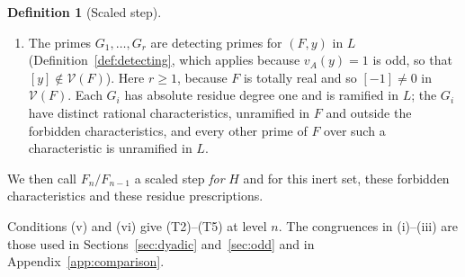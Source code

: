 \documentclass[11pt]{article}
\theoremstyle{plain}
\theoremstyle{definition}
\newtheorem{definition}[theorem]{Definition}
\theoremstyle{remark}
\begin{document}
\begin{definition}[Scaled step]
\begin{enumerate}
$L$.  The residues of $\alpha$ at $P$ and at $Q$ are nonsquares.
\item[(vi)] The primes $G_1,\dots,G_r$ are detecting primes for
$(F,y)$ in $L$ (Definition~\ref{def:detecting}, which applies because
$v_A(y)=1$ is odd, so that $[y]\notin\mathcal V(F)$).  Here $r\ge1$,
because $F$ is totally real and so $[-1]\ne0$ in $\mathcal V(F)$.
Each $G_i$ has absolute residue degree one and is ramified in $L$; the
$G_i$ have distinct rational characteristics, unramified in $F$ and
outside the forbidden characteristics, and every other prime of $F$
over such a characteristic is unramified in $L$.
\end{enumerate}
We then call $F_n/F_{n-1}$ a scaled step \emph{for} $H$ and for this
inert set, these forbidden characteristics and these residue
prescriptions.
\end{definition}
Conditions (v) and (vi) give \textup{(T2)}--\textup{(T5)} at level
$n$.  The congruences in (i)--(iii) are those used in
Sections~\ref{sec:dyadic} and~\ref{sec:odd} and in
Appendix~\ref{app:comparison}.
\end{document}
